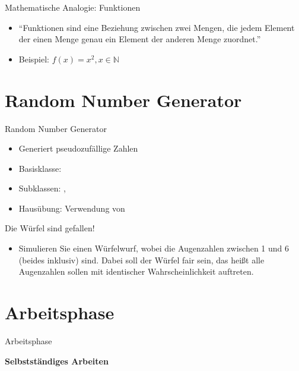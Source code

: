 \documentclass{../tuda-beamer}
\begin{document}
    \begin{frame}
        
    \end{frame}

    \begin{frame}{Mathematische Analogie: Funktionen}
        \begin{itemize}
            \item \enquote{Funktionen sind eine Beziehung zwischen zwei Mengen, die jedem Element
            der einen Menge genau ein Element der anderen Menge zuordnet.}
            \item Beispiel: \(f(x) = x^2, x \in \mathbb{N}\)

            
        \end{itemize}
    \end{frame}


    \section{Random Number Generator}
    \begin{frame}{Random Number Generator}
        \begin{itemize}
            \item Generiert pseudozufällige Zahlen
            \item Basisklasse: 
            \item Subklassen: , 
            \item Hausübung: Verwendung von 
        \end{itemize}
    \end{frame}

    \begin{frame}{Die Würfel sind gefallen!}
        \begin{itemize}
            \item Simulieren Sie einen Würfelwurf, wobei die Augenzahlen zwischen 1 und 6 (beides
            inklusiv) sind. Dabei soll der Würfel fair sein, das heißt alle Augenzahlen sollen mit
            identischer Wahrscheinlichkeit auftreten.
        \end{itemize}

        
    \end{frame}


    \section{Arbeitsphase}
    \begin{frame}[c]{Arbeitsphase}
        \begin{center}
            \textbf{\LARGE Selbstständiges Arbeiten}
        \end{center}
    \end{frame}
\end{document}
